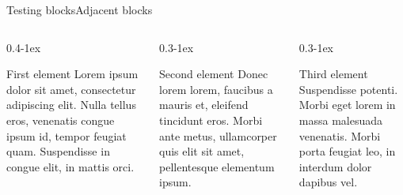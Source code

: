 \documentclass[aspectratio=169]{beamer}
\begin{document}


\begin{frame}{Testing blocks}{Adjacent blocks}
  \begin{columns}[t,onlytextwidth]
    \begin{column}{0.4\textwidth-1ex}
      \begin{block}{First element}
        Lorem ipsum dolor sit amet, consectetur adipiscing elit. Nulla tellus eros, venenatis congue ipsum id, tempor feugiat quam. Suspendisse in congue elit, in mattis orci.
      \end{block}
    \end{column}

    \begin{column}{0.3\textwidth-1ex}
      \begin{block}{Second element}
        Donec lorem lorem, faucibus a mauris et, eleifend tincidunt eros. Morbi ante metus, ullamcorper quis elit sit amet, pellentesque elementum ipsum.
      \end{block}
    \end{column}

    \begin{column}{0.3\textwidth-1ex}
      \begin{block}{Third element}
        Suspendisse potenti. Morbi eget lorem in massa malesuada venenatis. Morbi porta feugiat leo, in interdum dolor dapibus vel.
      \end{block}
    \end{column}
  \end{columns}
\end{frame}


\end{document}
